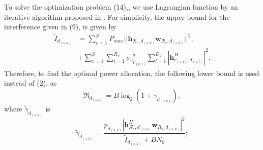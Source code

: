 \documentclass[journal,onecolumn,11pt,draftcls,doublespace]{IEEEtran}
\begin{document}
To solve the optimization problem (14),, we use Lagrangian function  by an iterative algorithm proposed in \cite{11}.
For simplicity, the upper bound for the interference given in (9), is given by
\begin{equation}
\begin{split}
\tilde{I}_{d_{(s,k)}} &= \sum_{v=1}^{S} P_{max}|| \boldsymbol{h}_{\mathcal{R}_v,d_{(s,k)}} \boldsymbol{w}_{\mathcal{R}_v,d_{(s,k)}}||^2 ,\\
& +  \sum_{v=1}^{S} \sum_{i=1}^{{R}_v} {\sigma_q}_{r_{(v,i)}}^2 \sum_{l=1}^{{D}_s} |\boldsymbol{h}_{r_{(v,i)}, d_{(v,l)}}^H|^2.
\end{split}
\end{equation}
Therefore, to find the optimal power allocation, the following lower bound is used instead of (2), as
\begin{equation}\label{e11}
\mathfrak{\tilde{R}}_{d_{(s,k)}} = B \log_2(1+\tilde{\gamma}_{d_{(s,k)}}),
\end{equation}
where $\tilde{\gamma}_{d_{(s,k)}}$ is
\begin{equation}\label{15}
\tilde{\gamma}_{d_{(s,k)}} =  \frac{p_{d_{(s,k)}}|\boldsymbol{h}_{\mathcal{R}_s, d_{(s,k)}}^H \boldsymbol{w}_{R_{s},d_{(s,k)}}|^2}{\tilde{I}_{d_{(s,k)}}+BN_0};
\end{equation}
\end{document}
